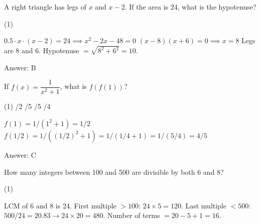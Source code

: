 \documentclass[11pt,paper=a4,answers]{exam}
\begin{document}
\begin{questions}
\vspace{1cm}

\question
A right triangle has legs of $x$ and $x-2$. If the area is 24, what is the hypotenuse?

\begin{tasks}(1)
    
\end{tasks}

\begin{solution}
\begin{center}
$0.5 \cdot x \cdot (x-2) = 24 \implies x^2 - 2x - 48 = 0$
\vspace{5pt}
$(x-8)(x+6) = 0 \implies x = 8$
\vspace{5pt}
Legs are 8 and 6. Hypotenuse $= \sqrt{8^2 + 6^2} = 10$.
\end{center}

Answer: \colorbox{yellow!100}{B}
\end{solution}

\vspace{1cm}

\question
If $f(x) = \dfrac{1}{x^2 + 1}$, what is $f(f(1))$?

\begin{tasks}(1)
/2 /5 /5  /4
\end{tasks}

\begin{solution}
\begin{center}
$f(1) = 1 / (1^2 + 1) = 1/2$
\vspace{5pt}
$f(1/2) = 1 / ((1/2)^2 + 1) = 1 / (1/4 + 1) = 1 / (5/4) = 4/5$
\end{center}

Answer: \colorbox{yellow!100}{C}
\end{solution}

\vspace{1cm}

\question
How many integers between 100 and 500 are divisible by both 6 and 8?

\begin{tasks}(1)
    
\end{tasks}

\begin{solution}
\begin{center}
LCM of 6 and 8 is 24.
\vspace{5pt}
First multiple $> 100$: $24 \times 5 = 120$.
\vspace{5pt}
Last multiple $< 500$: $500 / 24 = 20.83 \to 24 \times 20 = 480$.
\vspace{5pt}
Number of terms $= 20 - 5 + 1 = 16$.
\end{center}


\end{solution}
\end{questions}
\end{document}
